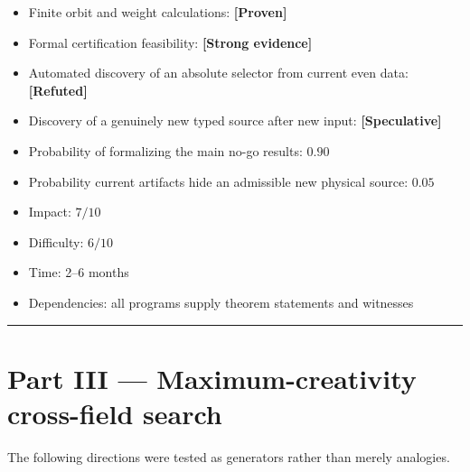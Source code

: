 \documentclass[11pt,a4paper,openany]{report}
\newcommand{\statusProven}{\textcolor{fingreen}{[Proven]}}
\newcommand{\statusStrong}{\textcolor{finblue}{[Strong evidence]}}
\newcommand{\statusSpeculative}{\textcolor{finorange}{[Speculative]}}
\newcommand{\statusRefuted}{\textcolor{finred}{[Refuted]}}
\begin{document}
\begin{itemize}
\item 
Finite orbit and weight calculations: \textbf{\statusProven{}}

\item 
Formal certification feasibility: \textbf{\statusStrong{}}

\item 
Automated discovery of an absolute selector from current even data: \textbf{\statusRefuted{}}

\item 
Discovery of a genuinely new typed source after new input: \textbf{\statusSpeculative{}}

\item 
Probability of formalizing the main no-go results: \(0.90\)

\item 
Probability current artifacts hide an admissible new physical source: \(0.05\)

\item 
Impact: \(7/10\)

\item 
Difficulty: \(6/10\)

\item 
Time: 2–6 months

\item 
Dependencies: all programs supply theorem statements and witnesses

\end{itemize}

\par\medskip\hrule\medskip

\chapter{Part III — Maximum-creativity cross-field search}

The following directions were tested as generators rather than merely analogies.
\end{document}
